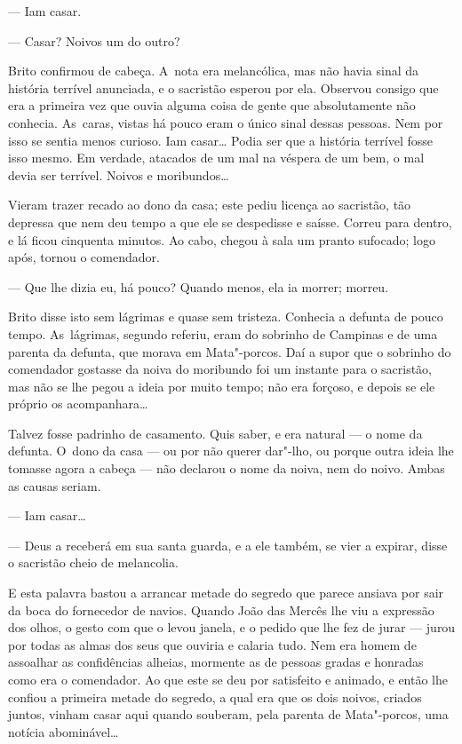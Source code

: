 \begin{linenumbers}
--- Iam casar.

--- Casar? Noivos um do outro?

Brito confirmou de cabeça. A~nota era melancólica, mas não havia sinal
da história terrível anunciada, e o sacristão esperou por ela. Observou
consigo que era a primeira vez que ouvia alguma coisa de gente que
absolutamente não conhecia. As~caras, vistas há pouco eram o único sinal
dessas pessoas. Nem por isso se sentia menos curioso. Iam casar\ldots{} Podia
ser que a história terrível fosse isso mesmo. Em verdade, atacados de um
mal na véspera de um bem, o mal devia ser terrível. Noivos e
moribundos\ldots{}

Vieram trazer recado ao dono da casa; este pediu licença ao sacristão,
tão depressa que nem deu tempo a que ele se despedisse e saísse. Correu
para dentro, e lá ficou cinquenta minutos. Ao cabo, chegou à sala um
pranto sufocado; logo após, tornou o comendador.

--- Que lhe dizia eu, há pouco? Quando menos, ela ia morrer; morreu.

Brito disse isto sem lágrimas e quase sem tristeza. Conhecia a defunta
de pouco tempo. As~lágrimas, segundo referiu, eram do sobrinho de
Campinas e de uma parenta da defunta, que morava em Mata"-porcos. Daí a
supor que o sobrinho do comendador gostasse da noiva do moribundo foi um
instante para o sacristão, mas não se lhe pegou a ideia por muito tempo;
não era forçoso, e depois se ele próprio os acompanhara\ldots{}

Talvez fosse padrinho de casamento. Quis saber, e era natural --- o nome
da defunta. O~dono da casa --- ou por não querer dar"-lho, ou porque outra
ideia lhe tomasse agora a cabeça --- não declarou o nome da noiva, nem do
noivo. Ambas as causas seriam.

--- Iam casar\ldots{}

--- Deus a receberá em sua santa guarda, e a ele também, se vier a
expirar, disse o sacristão cheio de melancolia.

E esta palavra bastou a arrancar metade do segredo que parece ansiava
por sair da boca do fornecedor de navios. Quando João das Mercês lhe viu
a expressão dos olhos, o gesto com que o levou janela, e o pedido que
lhe fez de jurar --- jurou por todas as almas dos seus que ouviria e
calaria tudo. Nem era homem de assoalhar as confidências alheias,
mormente as de pessoas gradas e honradas como era o comendador. Ao que
este se deu por satisfeito e animado, e então lhe confiou a primeira
metade do segredo, a qual era que os dois noivos, criados juntos, vinham
casar aqui quando souberam, pela parenta de Mata"-porcos, uma notícia
abominável\ldots{}


\end{linenumbers}
